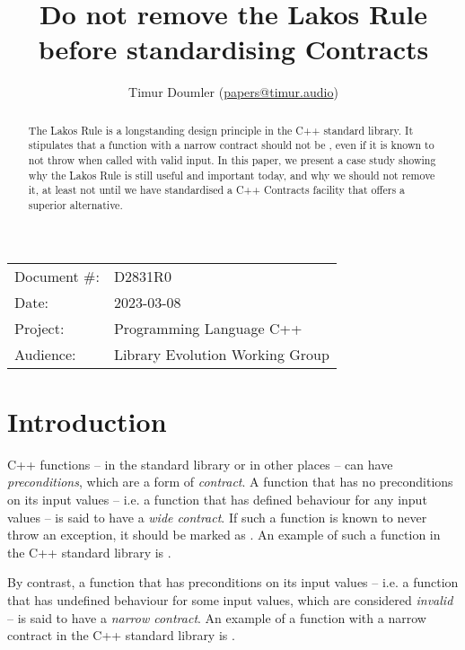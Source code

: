 


\title{Do not remove the Lakos Rule before standardising Contracts}
\author{ Timur Doumler \small(\href{mailto:papers@timur.audio}{papers@timur.audio})  }
\date{}
\maketitle

\begin{tabular}{ll}
Document \#: & D2831R0 \\
Date: &2023-03-08 \\
Project: & Programming Language C++ \\
Audience: & Library Evolution Working Group
\end{tabular}

\begin{abstract}
The Lakos Rule is a longstanding design principle in the C++ standard library. It stipulates that a function with a narrow contract should not be  , even if it is known to not throw when called with valid input. In this paper, we present a case study showing why the Lakos Rule is still useful and important today, and why we should not remove it, at least not until we have standardised a C++ Contracts facility that offers a superior alternative.
\end{abstract}

\section{Introduction}
\label{sec:intro}

C++ functions -- in the standard library or in other places -- can have \emph{preconditions}, which are a form of \emph{contract}. A function that has no preconditions on its input values -- i.e. a function that has defined behaviour for any input values -- is said to have a \emph{wide contract}.  If such a function is known to never throw an exception, it should be marked as . An example of such a function in the C++ standard library is .

By contrast, a function that has preconditions on its input values -- i.e. a function that has undefined behaviour for some input values, which are considered \emph{invalid} -- is said to have a \emph{narrow contract}. An example of a function with a narrow contract in the C++ standard library is .

